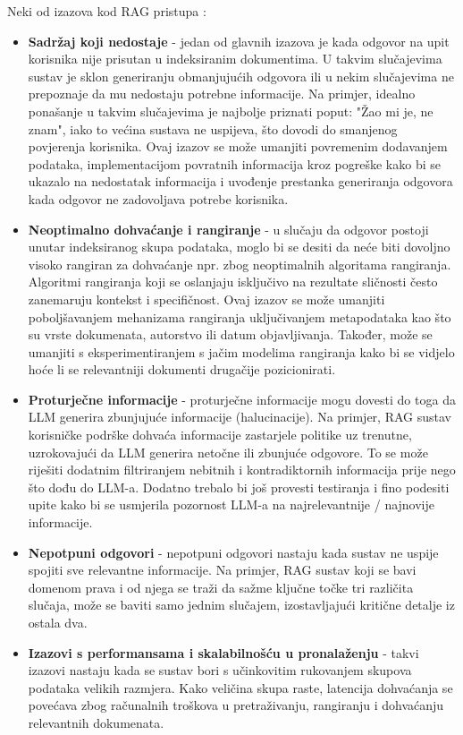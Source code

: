 \documentclass[]{foi}
\begin{document}
Neki od izazova kod RAG pristupa \cite{aimlabs2025rag}:
\begin{itemize}
    \item \textbf{Sadržaj koji nedostaje} - jedan od glavnih izazova je kada odgovor na upit korisnika nije prisutan u indeksiranim dokumentima. U takvim slučajevima sustav je sklon 
    generiranju obmanjujućih odgovora ili u nekim slučajevima ne prepoznaje da mu nedostaju potrebne informacije. Na primjer, idealno ponašanje
    u takvim slučajevima je najbolje priznati poput: "Žao mi je, ne znam", iako to većina sustava ne uspijeva, što dovodi do smanjenog povjerenja
    korisnika. Ovaj izazov se može umanjiti povremenim dodavanjem podataka, implementacijom povratnih informacija kroz pogreške kako bi se ukazalo na
    nedostatak informacija i uvođenje prestanka generiranja odgovora kada odgovor ne zadovoljava potrebe korisnika. 
    \item \textbf{Neoptimalno dohvaćanje i rangiranje} - u slučaju da odgovor postoji unutar indeksiranog skupa podataka, moglo bi se desiti da neće biti dovoljno visoko rangiran za dohvaćanje 
    npr. zbog neoptimalnih algoritama rangiranja. Algoritmi rangiranja koji se oslanjaju isključivo na rezultate sličnosti često zanemaruju kontekst
    i specifičnost. Ovaj izazov se može umanjiti poboljšavanjem mehanizama rangiranja uključivanjem metapodataka kao što su vrste dokumenata,
    autorstvo ili datum objavljivanja. Također, može se umanjiti s eksperimentiranjem s jačim modelima rangiranja kako bi se vidjelo hoće li 
    se relevantniji dokumenti drugačije pozicionirati.
    \item \textbf{Proturječne informacije} - proturječne informacije mogu dovesti do toga da LLM generira zbunjujuće informacije (halucinacije). Na primjer, RAG sustav korisničke podrške
    dohvaća informacije zastarjele politike uz trenutne, uzrokovajući da LLM generira netočne ili zbunjuće odgovore. To se može riješiti dodatnim
    filtriranjem nebitnih i kontradiktornih informacija prije nego što dođu do LLM-a. Dodatno trebalo bi još provesti testiranja i fino podesiti
    upite kako bi se usmjerila pozornost LLM-a na najrelevantnije / najnovije informacije. 
    \item \textbf{Nepotpuni odgovori} - nepotpuni odgovori nastaju kada sustav ne uspije spojiti sve relevantne informacije. Na primjer, RAG sustav koji se bavi domenom prava i od njega
    se traži da sažme ključne točke tri različita slučaja, može se baviti samo jednim slučajem, izostavljajući kritične detalje iz ostala dva. 
    \item \textbf{Izazovi s performansama i skalabilnošću u pronalaženju} - takvi izazovi nastaju kada se sustav bori s učinkovitim rukovanjem skupova podataka velikih razmjera. Kako veličina skupa raste, latencija
    dohvaćanja se povećava zbog računalnih troškova u pretraživanju, rangiranju i dohvaćanju relevantnih dokumenata. 
\end{itemize}
\newpage
\end{document}
